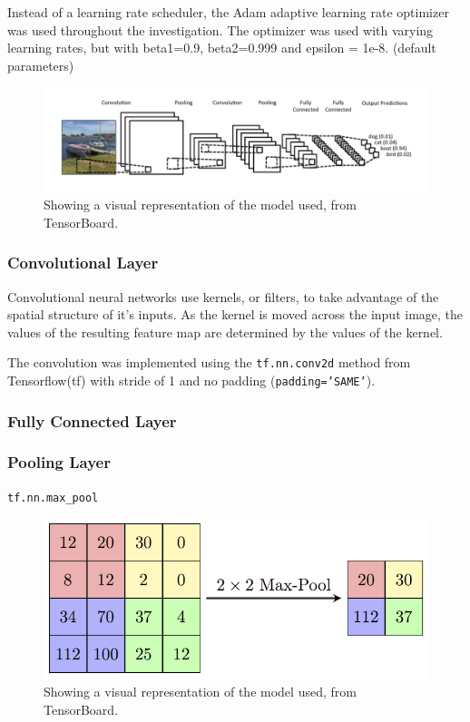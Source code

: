 \documentclass[]{article}
\begin{document}
Instead of a learning rate scheduler, the Adam adaptive learning rate optimizer was used throughout the investigation. The optimizer was used with varying learning rates, but with beta1=0.9, beta2=0.999 and epsilon = 1e-8. (default parameters) 

\begin{figure}[h]
	\includegraphics[width=\textwidth]{conv}
	\caption{Showing a visual representation of the model used, from TensorBoard.}
	\label{conv}
	\centering
\end{figure}

\subsubsection{Convolutional Layer}

Convolutional neural networks use kernels, or filters, to take advantage of the spatial structure of it’s inputs. As the kernel is moved across the input image, the values of the resulting feature map are determined by the values of the kernel.

The convolution was implemented using the \texttt{tf.nn.conv2d} method from Tensorflow(tf) with stride of 1 and no padding (\texttt{padding='SAME'}). 

\subsubsection{Fully Connected Layer}



\subsubsection{Pooling Layer}

\texttt{tf.nn.max\_pool}

\begin{figure}[h]
	\includegraphics[width=\textwidth]{pool}
	\caption{Showing a visual representation of the model used, from TensorBoard.}
	\label{pool}
	\centering
\end{figure}
\end{document}
